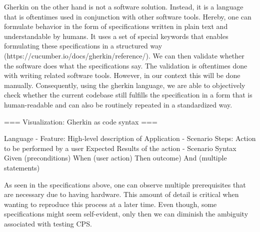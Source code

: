 Gherkin on the other hand is not a software solution. Instead, it is a language that is oftentimes used in conjunction with other software tools. Hereby, one can formulate behavior in the form of specifications written in plain text and understandable by humans. It uses a set of special keywords that enables formulating these specifications in a structured way (https://cucumber.io/docs/gherkin/reference/). We can then validate whether the software does what the specifications say. The validation is oftentimes done with writing related software tools. However, in our context this will be done manually. Consequently, using the gherkin language, we are able to objectively check whether the current codebase still fulfills the specification in a form that is human-readable and can also be routinely repeated in a standardized way. 

=== Visualization: Gherkin as code syntax ===

Language
- Feature: 
	High-level description of Application
- Scenario Steps: 
	Action to be performed by a user
	Expected Results of the action
- Scenario Syntax
	Given (preconditions)
	When (user action)
	Then outcome)
	And (multiple statements)

As seen in the specifications above, one can observe multiple prerequisites that are necessary due to having hardware. This amount of detail is critical when wanting to reproduce this process at a later time. Even though, some specifications might seem self-evident, only then we can diminish the ambiguity associated with testing CPS. 




